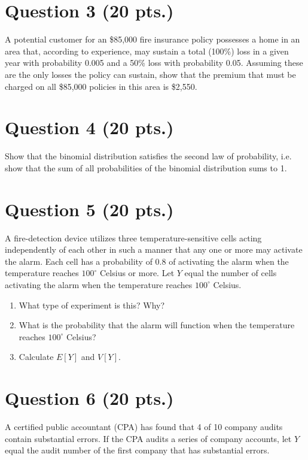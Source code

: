 \documentclass[11pt]{article}
\theoremstyle{definition}
\begin{document}
\section*{Question 3 (20 pts.)}

A potential customer for an \$85,000 fire insurance policy possesses a home in an area that, according to experience, may sustain a total (100\%) loss in a given year with probability 0.005 and a 50\% loss with probability 0.05. Assuming these are the only losses the policy can sustain, show that the premium that must be charged on all \$85,000 policies in this area is \$2,550.

\newpage

\section*{Question 4 (20 pts.)}

Show that the binomial distribution satisfies the second law of probability, i.e. show that the sum of all probabilities of the binomial distribution sums to 1.

\newpage

\section*{Question 5 (20 pts.)}

A fire-detection device utilizes three temperature-sensitive cells acting independently of each other in such a manner that any one or more may activate the alarm. Each cell has a probability of 0.8 of activating the alarm when the temperature reaches $100^\circ$ Celsius or more. Let $Y$ equal the number of cells activating the alarm when the temperature reaches $100^\circ$ Celsius.

\begin{enumerate}
	\item What type of experiment is this? Why?
	\item What is the probability that the alarm will function when the temperature reaches $100^\circ$ Celsius?
	\item Calculate $E[Y]$ and $V[Y]$.
\end{enumerate}

\newpage

\section*{Question 6 (20 pts.)}

A certified public accountant (CPA) has found that 4 of 10 company audits contain substantial errors. If the CPA audits a series of company accounts, let $Y$ equal the audit number of the first company that has substantial errors.
\end{document}
